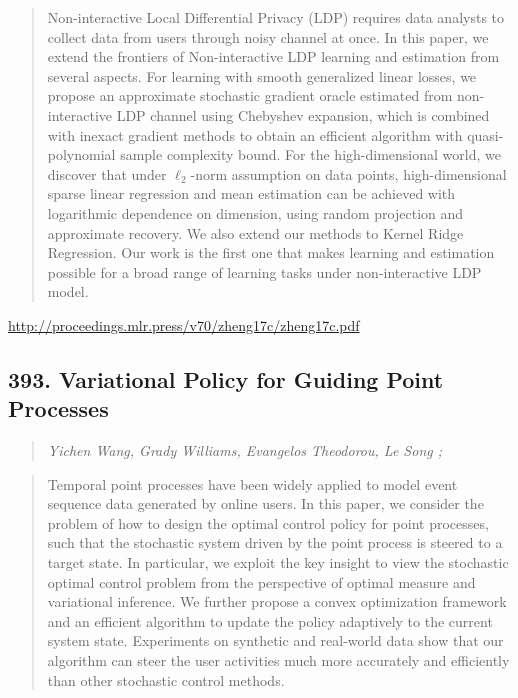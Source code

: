 \documentclass{article}
\begin{document}
\begin{quote}
    Non-interactive Local Differential Privacy (LDP) requires data analysts to collect data from users through noisy channel at once. In this paper, we extend the frontiers of Non-interactive LDP learning and estimation from several aspects. For learning with smooth generalized linear losses, we propose an approximate stochastic gradient oracle estimated from non-interactive LDP channel using Chebyshev expansion, which is combined with inexact gradient methods to obtain an efficient algorithm with quasi-polynomial sample complexity bound. For the high-dimensional world, we discover that under $\ell_2$-norm assumption on data points, high-dimensional sparse linear regression and mean estimation can be achieved with logarithmic dependence on dimension, using random projection and approximate recovery. We also extend our methods to Kernel Ridge Regression. Our work is the first one that makes learning and estimation possible for a broad range of learning tasks under non-interactive LDP model.  \end{quote}

\href{http://proceedings.mlr.press/v70/zheng17c/zheng17c.pdf}{http://proceedings.mlr.press/v70/zheng17c/zheng17c.pdf}

\subsection{393. Variational Policy for Guiding Point Processes}

\begin{quote}
\footnotesize{\textit{Yichen Wang, Grady Williams, Evangelos Theodorou, Le Song ;}}
\end{quote}

\begin{quote}
    Temporal point processes have been widely applied to model event sequence data generated by online users. In this paper, we consider the problem of how to design the optimal control policy for point processes, such that the stochastic system driven by the point process is steered to a target state. In particular, we exploit the key insight to view the stochastic optimal control problem from the perspective of optimal measure and variational inference. We further propose a convex optimization framework and an efficient algorithm to update the policy adaptively to the current system state. Experiments on synthetic and real-world data show that our algorithm can steer the user activities much more accurately and efficiently than other stochastic control methods.  \end{quote}
\end{document}

